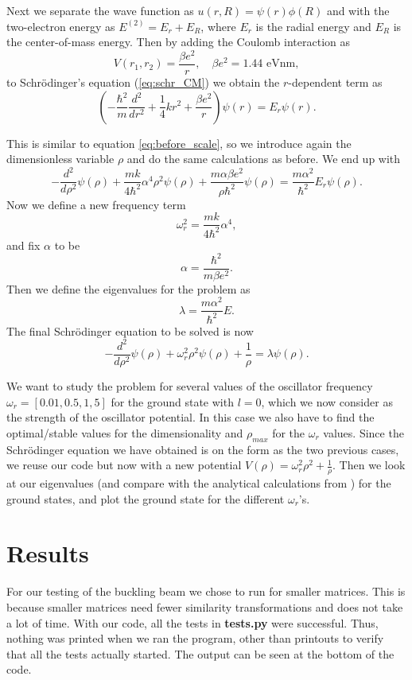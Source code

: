 \documentclass[12pt,a4paper,english]{article}
\begin{document}
Next we separate the wave function as $u(r,R)=\psi(r)\phi(R)$ and with the two-electron energy as $E^{(2)}=E_r+E_R$, where $E_r$ is the radial energy and $E_R$ is the center-of-mass energy. Then by adding the Coulomb interaction as 
\[V(r_1,r_2)=\frac{\beta e^2}{r},\quad \beta e^2=1.44 \text{ eVnm},\]
to Schrödinger's equation (\ref{eq:schr_CM}) we obtain the $r$-dependent term as
\begin{equation}
\label{eq:shcr_split_2}
\left(-\frac{\hbar^2}{m}\frac{d^2}{dr^2}+\frac{1}{4}kr^2+\frac{\beta e^2}{r}\right)\psi(r)=E_r\psi(r).
\end{equation}

This is similar to equation \ref{eq:before_scale}, so we introduce again the dimensionless variable $\rho$ and do the same calculations as before. We end up with 
\begin{equation}
\label{eq:before_alpha_2}
-\frac{d^2}{d\rho^2}\psi(\rho)+\frac{mk}{4\hbar^2}\alpha^4\rho^2\psi(\rho)+\frac{m\alpha\beta e^2}{\rho\hbar^2}\psi(\rho)=\frac{m\alpha^2}{\hbar^2}E_r\psi(\rho).
\end{equation}
Now we define a new frequency term
\[\omega_r^2=\frac{mk}{4\hbar^2}\alpha^4,\]
and fix $\alpha$ to be
\[\alpha=\frac{\hbar^2}{m\beta e^2}.\]
Then we define the eigenvalues for the problem as 
\begin{equation}
\label{eq:eigenval_2}
\lambda=\frac{m\alpha^2}{\hbar^2}E.
\end{equation}
The final Schrödinger equation to be solved is now
\begin{equation}
\label{eq:final_schr_2}
-\frac{d^2}{d\rho^2}\psi(\rho)+\omega_r^2\rho^2\psi(\rho)+\frac{1}{\rho}=\lambda\psi(\rho).
\end{equation}

We want to study the problem for several values of the oscillator frequency\\ $\omega_r=[0.01, 0.5, 1, 5]$ for the ground state with $l=0$, which we now consider as the strength of the oscillator potential. In this case we also have to find the optimal/stable values for the dimensionality and $\rho_{max}$ for the $\omega_r$ values. Since the Schrödinger equation we have obtained is on the form as the two previous cases, we reuse our code but now with a new potential $V(\rho)=\omega_r^2\rho^2+\frac{1}{\rho}$. Then we look at our eigenvalues (and compare with the analytical calculations from \citet{Taut}) for the ground states, and plot the ground state for the different $\omega_r$'s.

\section{Results}
For our testing of the buckling beam we chose to run for smaller matrices. This is because smaller matrices need fewer similarity transformations and does not take a lot of time. With our code, all the tests in \textbf{tests.py} were successful. Thus, nothing was printed when we ran the program, other than printouts to verify that all the tests actually started. The output can be seen at the bottom of the code.
\end{document}
